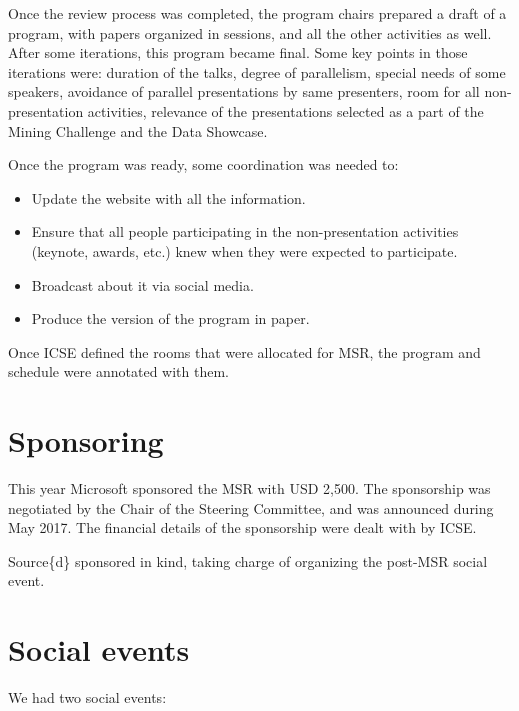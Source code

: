 \documentclass[a4paper]{report}
\begin{document}
Once the review process was completed, the program chairs prepared a draft of a program, with papers organized in sessions, and all the other activities as well. After some iterations, this program became final. Some key points in those iterations were: duration of the talks, degree of parallelism, special needs of some speakers, avoidance of parallel presentations by same presenters, room for all non-presentation activities, relevance of the presentations selected as a part of the Mining Challenge and the Data Showcase.

Once the program was ready, some coordination was needed to:

\begin{itemize}
\item Update the website with all the information.
\item Ensure that all people participating in the non-presentation activities (keynote, awards, etc.) knew when they were expected to participate.
\item Broadcast about it via social media.
\item Produce the version of the program in paper.
\end{itemize}

Once ICSE defined the rooms that were allocated for MSR, the program and schedule were annotated with them.

\section{Sponsoring}

This year Microsoft sponsored the MSR with USD 2,500. The sponsorship was negotiated by the Chair of the Steering Committee, and was announced during May 2017. The financial details of the sponsorship were dealt with by ICSE.

Source\{d\} sponsored in kind, taking charge of organizing the post-MSR social event.

\section{Social events}

We had two social events:
\end{document}
